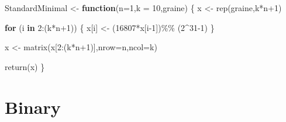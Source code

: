 \documentclass[
]{article}
\newenvironment{Shaded}{\begin{snugshade}}{\end{snugshade}}
\newcommand{\AttributeTok}[1]{\textcolor[rgb]{0.77,0.63,0.00}{#1}}
\newcommand{\ControlFlowTok}[1]{\textcolor[rgb]{0.13,0.29,0.53}{\textbf{#1}}}
\newcommand{\DecValTok}[1]{\textcolor[rgb]{0.00,0.00,0.81}{#1}}
\newcommand{\FunctionTok}[1]{\textcolor[rgb]{0.00,0.00,0.00}{#1}}
\newcommand{\NormalTok}[1]{#1}
\newcommand{\OtherTok}[1]{\textcolor[rgb]{0.56,0.35,0.01}{#1}}
\newcommand{\SpecialCharTok}[1]{\textcolor[rgb]{0.00,0.00,0.00}{#1}}
\begin{document}
\begin{Shaded}
\begin{Highlighting}[]
\NormalTok{StandardMinimal }\OtherTok{\textless{}{-}} \ControlFlowTok{function}\NormalTok{(}\AttributeTok{n=}\DecValTok{1}\NormalTok{,}\AttributeTok{k =} \DecValTok{10}\NormalTok{,graine)}
\NormalTok{\{}
\NormalTok{  x }\OtherTok{\textless{}{-}}  \FunctionTok{rep}\NormalTok{(graine,k}\SpecialCharTok{*}\NormalTok{n}\SpecialCharTok{+}\DecValTok{1}\NormalTok{)}
  
  \ControlFlowTok{for}\NormalTok{ (i }\ControlFlowTok{in} \DecValTok{2}\SpecialCharTok{:}\NormalTok{(k}\SpecialCharTok{*}\NormalTok{n}\SpecialCharTok{+}\DecValTok{1}\NormalTok{)) \{}
\NormalTok{    x[i] }\OtherTok{\textless{}{-}}\NormalTok{ (}\DecValTok{16807}\SpecialCharTok{*}\NormalTok{x[i}\DecValTok{{-}1}\NormalTok{])}\SpecialCharTok{\%\%}\NormalTok{ (}\DecValTok{2}\SpecialCharTok{\^{}}\DecValTok{31{-}1}\NormalTok{)}
\NormalTok{  \}}
  
\NormalTok{  x }\OtherTok{\textless{}{-}} \FunctionTok{matrix}\NormalTok{(x[}\DecValTok{2}\SpecialCharTok{:}\NormalTok{(k}\SpecialCharTok{*}\NormalTok{n}\SpecialCharTok{+}\DecValTok{1}\NormalTok{)],}\AttributeTok{nrow=}\NormalTok{n,}\AttributeTok{ncol=}\NormalTok{k)}
  
  \FunctionTok{return}\NormalTok{(x)}
\NormalTok{\}}
\end{Highlighting}
\end{Shaded}

\section*{Binary}

\label{subsec:binary}
\end{document}
